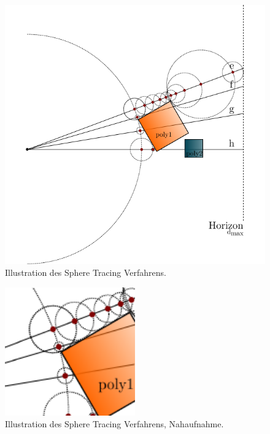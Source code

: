\begin{figure}[H]
    \centering
    \includegraphics{img/sphere_tracing_principle.pdf}
    \caption{Illustration des Sphere Tracing
        Verfahrens.\protect\footnotemark}\label{fig:sphere_tracing_1}
\end{figure}

\begin{figure}[H]
    \centering
    \includegraphics[width=0.5\textwidth]{img/sphere_tracing_principle_near.pdf}
    \caption{Illustration des Sphere Tracing Verfahrens,
        Nahaufnahme.\protect\footnotemark}\label{fig:sphere_tracing_2}
\end{figure}

